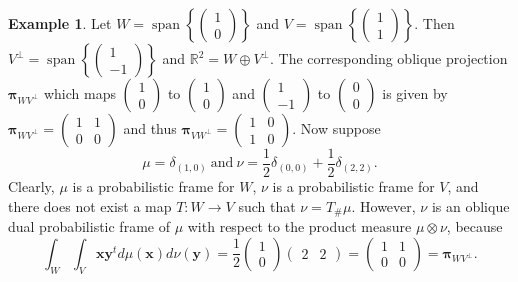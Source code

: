 \documentclass{amsart}
\numberwithin{equation}{section}
\DeclareMathOperator{\spanning}{span}
\newcommand{\bpi}{{\boldsymbol{\pi}}}
\theoremstyle{plain}
\theoremstyle{remark}
\theoremstyle{definition}
\newtheorem{example}[theorem]{Example}
\begin{document}
\begin{example}\label{ex:non_pushforward}
Let $W = \spanning\left\{\begin{pmatrix}
        1 \\0
    \end{pmatrix}\right\}$ and $V = \spanning\left\{\begin{pmatrix}
        1 \\1
    \end{pmatrix}\right\}$.
    Then $V^\perp = \spanning\left\{\begin{pmatrix}
        1 \\-1
    \end{pmatrix}\right\}$ and $\mathbb{R}^2 = W \oplus V^\perp $. 
The corresponding oblique projection $\bpi_{WV^\perp}$ which maps $\begin{pmatrix}
        1 \\0
    \end{pmatrix}$ to $\begin{pmatrix}
        1 \\0
    \end{pmatrix}$ and $\begin{pmatrix}
        1 \\-1
    \end{pmatrix}$ to $\begin{pmatrix}
        0 \\0
    \end{pmatrix}$
    is given by $
\bpi_{WV^\perp} = 
\begin{pmatrix}
1 & 1 \\
0 & 0
\end{pmatrix}$
and thus $
\bpi_{VW^\perp} = 
\begin{pmatrix}
1 & 0 \\
1 & 0
\end{pmatrix}$. 
Now suppose 
$$\mu = \delta_{(1,0)} \ \text{and} \ \nu = \frac{1}{2}\delta_{(0,0)} + \frac{1}{2}\delta_{(2,2)}.$$
Clearly, $\mu$ is a probabilistic frame for $W$, $\nu$ is a probabilistic frame for $V$, and there does not exist a map $T: W \rightarrow V$ such that $\nu = T_\# \mu$. 
However, $\nu$ is an oblique dual probabilistic frame of $\mu$ with respect to the product measure $\mu \otimes \nu$, because
    \begin{equation*}
         \int_{W} \int_{V} \mathbf{x} \mathbf{y}^t d\mu(\mathbf{x}) d\nu(\mathbf{y}) 
         =  \frac{1}{2}\begin{pmatrix}
        1 \\0
    \end{pmatrix}  \begin{pmatrix}
        2 & 2
    \end{pmatrix} 
    = \begin{pmatrix}
        1 & 1 \\ 0
& 0    \end{pmatrix} =  \bpi_{WV^\perp}.
    \end{equation*}



\end{example}
\end{document}
